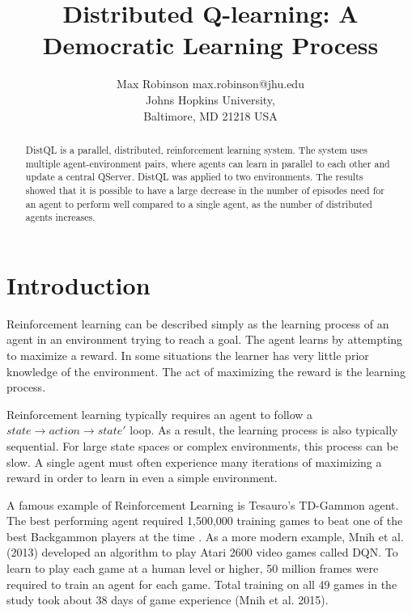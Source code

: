 \documentclass[jair,twoside,11pt,theapa]{article}
\begin{document}
\title{Distributed Q-learning: A Democratic Learning Process}

\author{\name Max Robinson \email max.robinson@jhu.edu \\
       \addr Johns Hopkins University,\\
       Baltimore, MD 21218 USA
   }


\maketitle

\begin{abstract}
DistQL is a parallel, distributed, reinforcement learning system. The system uses multiple agent-environment pairs, where agents can learn in parallel to each other and update a central QServer. DistQL was applied to two environments. The results showed that it is possible to have a large decrease in the number of episodes need for an agent to perform well compared to a single agent, as the number of distributed agents increases. 
\end{abstract}

\section{Introduction}
\label{Introduction}
Reinforcement learning can be described simply as the learning process of an agent in an environment trying to reach a goal. 
The agent learns by attempting to maximize a reward. In some situations the learner has very little prior knowledge of the environment. 
The act of maximizing the reward is the learning process.

Reinforcement learning typically requires an agent to follow a $state \to action \to state'$ loop. As a result, the learning process is also typically sequential. 
For large state spaces or complex environments, this process can be slow. A single agent must often experience many iterations of maximizing 
a reward in order to learn in even a simple environment.

A famous example of Reinforcement Learning is Tesauro's TD-Gammon agent.
The best performing agent required 1,500,000 training games to beat one of the best Backgammon players at the time \cite{Tesauro:1995:TDL:203330.203343}.
As a more modern example, Mnih et al. (2013) \nocite{Mnih2013} developed an algorithm to play Atari 2600 video games called DQN. To learn to play each game at a human level or higher,
50 million frames were required to train an agent for each game. Total training on all 49 games in the study took about 38 days of game experience (Mnih et al. 2015). 
\end{document}
